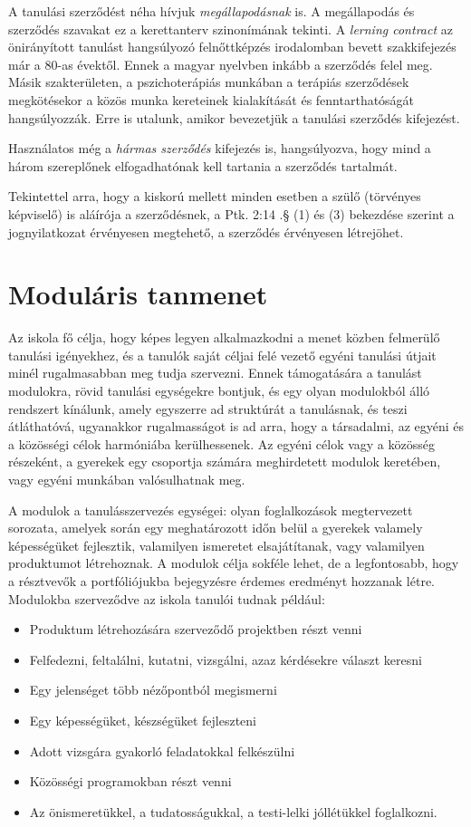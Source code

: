 A tanulási szerződést néha hívjuk \emph{megállapodásnak} is. A megállapodás és szerződés szavakat ez a kerettanterv szinonímának tekinti. A \emph{lerning contract} az önirányított tanulást hangsúlyozó felnőttképzés irodalomban
bevett szakkifejezés már a 80-as évektől\cite{Malcolm77}. Ennek a magyar nyelvben inkább a szerződés felel meg. Másik szakterületen, a pszichoterápiás munkában a terápiás szerződések megkötésekor a közös munka kereteinek kialakítását és fenntarthatóságát hangsúlyozzák.\cite{pszichoterapia} Erre is utalunk, amikor bevezetjük a tanulási szerződés kifejezést.

 Használatos még a \emph{hármas szerződés} kifejezés is, hangsúlyozva, hogy mind a három szereplőnek elfogadhatónak kell tartania a szerződés tartalmát.

Tekintettel arra, hogy a kiskorú mellett minden esetben a szülő (törvényes képviselő) is aláírója a szerződésnek, a Ptk. 2:14 .§ (1) és (3) bekezdése szerint a jognyilatkozat érvényesen megtehető, a szerződés érvényesen létrejöhet.

\section{Moduláris tanmenet}
\label{sec:modularis_tanmenet}

Az iskola fő célja, hogy képes legyen alkalmazkodni a menet közben felmerülő tanulási igényekhez, és a tanulók saját céljai felé vezető egyéni tanulási útjait minél rugalmasabban meg tudja szervezni. Ennek támogatására a tanulást modulokra, rövid tanulási egységekre bontjuk, és egy olyan modulokból álló rendszert kínálunk, amely egyszerre ad struktúrát a tanulásnak, és teszi átláthatóvá, ugyanakkor rugalmasságot is ad arra, hogy a társadalmi, az egyéni és a közösségi célok harmóniába kerülhessenek. Az egyéni célok vagy a közösség részeként, a gyerekek egy csoportja számára meghirdetett modulok keretében, vagy egyéni munkában valósulhatnak meg.

A modulok a tanulásszervezés egységei: olyan foglalkozások megtervezett sorozata, amelyek során egy meghatározott időn belül a gyerekek valamely képességüket fejlesztik, valamilyen ismeretet elsajátítanak, vagy valamilyen produktumot létrehoznak. A modulok célja sokféle lehet, de a legfontosabb, hogy a résztvevők a portfóliójukba bejegyzésre érdemes eredményt hozzanak létre. Modulokba szerveződve az iskola tanulói tudnak például:

\begin{itemize}
\item Produktum létrehozására szerveződő projektben részt venni
\item Felfedezni, feltalálni, kutatni, vizsgálni, azaz kérdésekre választ keresni
\item Egy jelenséget több nézőpontból megismerni
\item Egy képességüket, készségüket fejleszteni
\item Adott vizsgára gyakorló feladatokkal felkészülni
\item Közösségi programokban részt venni
\item Az önismeretükkel, a tudatosságukkal, a testi-lelki jóllétükkel foglalkozni.
\end{itemize}

